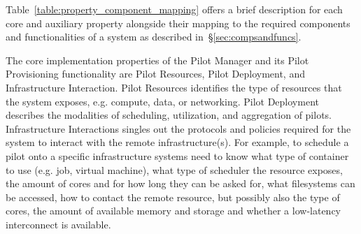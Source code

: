 \documentclass{sig-alternate}
\begin{document}


 



Table~\ref{table:property_component_mapping} offers a brief description for each
core and auxiliary property alongside their mapping to the required components
and functionalities of a \pilot system as described
in~\S\ref{sec:compsandfuncs}.

The core implementation properties of the Pilot Manager and its Pilot
Provisioning functionality are Pilot Resources, Pilot Deployment, and
Infrastructure Interaction. Pilot Resources identifies the type of resources
that the \pilot system exposes, e.g. compute, data, or networking. Pilot
Deployment describes the modalities of scheduling, utilization, and aggregation
of pilots. Infrastructure Interactions singles out the protocols and policies
required for the \pilot system to interact with the remote infrastructure(s).
For example, to schedule a pilot onto a specific infrastructure \pilot systems
need to know what type of container to use (e.g. job, virtual machine), what
type of scheduler the resource exposes, the amount of cores and for how long
they can be asked for, what filesystems can be accessed, how to contact the
remote resource, but possibly also the type of cores, the amount of available
memory and storage and whether a low-latency interconnect is available.

\end{document}
